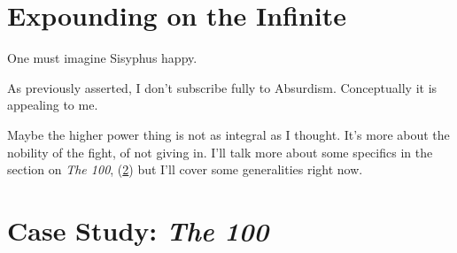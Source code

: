 \documentclass[../butidigress.tex]{subfiles}
\begin{document}
\section{Expounding on the Infinite}
\epigraph{One must imagine Sisyphus happy.}{}
As previously asserted, I don't subscribe fully to Absurdism.
Conceptually it is appealing to me.

Maybe the higher power thing is not as integral as I thought.
It's more about the nobility of the fight, of not giving in.
I'll talk more about some specifics in the section on \textit{The 100}, (\ref{sec:thehundred}) but I'll cover some generalities right now.

\section{Case Study: \textit{The 100}}\label{sec:thehundred}
\end{document}
